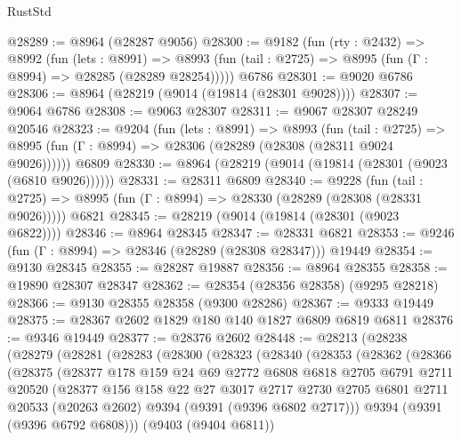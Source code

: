 \begin{lexlean}{RustStd}
\begin{coremodule}
@28289 := @8964 (@28287 @9056)
@28300 := @9182
    (fun (rty : @2432) =>
    @8992
      (fun (lets : @8991) =>
      @8993 (fun (tail : @2725) => @8995 (fun (Γ : @8994) => @28285 (@28289 @28254)))))
    @6786
@28301 := @9020 @6786
@28306 := @8964 (@28219 (@9014 (@19814 (@28301 @9028))))
@28307 := @9064 @6786
@28308 := @9063 @28307
@28311 := @9067 @28307 @28249 @20546
@28323 := @9204
    (fun (lets : @8991) =>
    @8993
      (fun (tail : @2725) =>
      @8995 (fun (Γ : @8994) => @28306 (@28289 (@28308 (@28311 @9024 @9026))))))
    @6809
@28330 := @8964 (@28219 (@9014 (@19814 (@28301 (@9023 (@6810 @9026))))))
@28331 := @28311 @6809
@28340 := @9228
    (fun (tail : @2725) => @8995 (fun (Γ : @8994) => @28330 (@28289 (@28308 (@28331 @9026)))))
    @6821
@28345 := @28219 (@9014 (@19814 (@28301 (@9023 @6822))))
@28346 := @8964 @28345
@28347 := @28331 @6821
@28353 := @9246 (fun (Γ : @8994) => @28346 (@28289 (@28308 @28347))) @19449
@28354 := @9130 @28345
@28355 := @28287 @19887
@28356 := @8964 @28355
@28358 := @19890 @28307 @28347
@28362 := @28354 (@28356 @28358) (@9295 @28218)
@28366 := @9130 @28355 @28358 (@9300 @28286)
@28367 := @9333 @19449
@28375 := @28367 @2602 @1829 @180 @140 @1827 @6809 @6819 @6811
@28376 := @9346 @19449
@28377 := @28376 @2602
@28448 := @28213
    (@28238
      (@28279
        (@28281
          (@28283
            (@28300
              (@28323
                (@28340
                  (@28353
                    (@28362
                      (@28366
                        (@28375
                          (@28377
                            @178
                            @159
                            @24
                            @69
                            @2772
                            @6808
                            @6818
                            @2705
                            @6791
                            @2711
                            @20520
                            (@28377
                              @156
                              @158
                              @22
                              @27
                              @3017
                              @2717
                              @2730
                              @2705
                              @6801
                              @2711
                              @20533
                              (@20263 @2602)
                              @9394
                              (@9391 (@9396 @6802 @2717)))
                            @9394
                            (@9391 (@9396 @6792 @6808)))
                          (@9403 (@9404 @6811))

\end{coremodule}
\end{lexlean}
